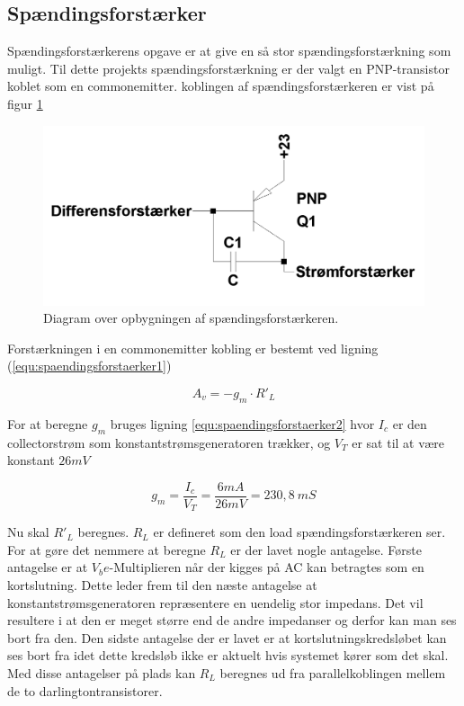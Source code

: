 \subsection{Spændingsforstærker}
\label{effekt_spaendingsforstaerker}
Spændingsforstærkerens opgave er at give en så stor spændingsforstærkning som muligt. Til dette projekts spændingsforstærkning er der valgt en PNP-transistor koblet som en commonemitter. koblingen af spændingsforstærkeren er vist på figur \ref{spaendingsforstaerker_diagram}

\begin{figure}[h]
\centering
\includegraphics[width=\textwidth]{teknisk/effektforstaerker/spaendingsforstaerker_diagram.png}
\caption{Diagram over opbygningen af spændingsforstærkeren.}
\label{spaendingsforstaerker_diagram}
\end{figure}

Forstærkningen i en commonemitter kobling er bestemt ved ligning (\ref{equ:spaendingsforstaerker1}) 

\begin{equation}
\label{equ:spaendingsforstaerker1}
A_v = -g_m \cdot R'_L
\end{equation}

For at beregne $g_m$ bruges ligning \ref{equ:spaendingsforstaerker2} hvor $I_c$ er den collectorstrøm som konstantstrømsgeneratoren trækker, og $V_T$ er sat til at være konstant $26 mV$

\begin{equation}
\label{equ:spaendingsforstaerker2}
g_m = \frac{I_c}{V_T} = \frac{6 mA}{26 mV} = 230,8~mS
\end{equation}

Nu skal $R'_L$ beregnes. $R_L$ er defineret som den load spændingsforstærkeren ser. For at gøre det nemmere at beregne $R_L$ er der lavet nogle antagelse. Første antagelse er at $V_be$-Multiplieren når der kigges på AC kan betragtes som en kortslutning. Dette leder frem til den næste antagelse at konstantstrømsgeneratoren repræsentere en uendelig stor impedans. Det vil resultere i at den er meget større end de andre impedanser og derfor kan man ses bort fra den. Den sidste antagelse der er lavet er at kortslutningskredsløbet kan ses bort fra idet dette kredsløb ikke er aktuelt hvis systemet  kører som det skal. Med disse antagelser på plads kan $R_L$ beregnes ud fra parallelkoblingen mellem de to darlingtontransistorer.

